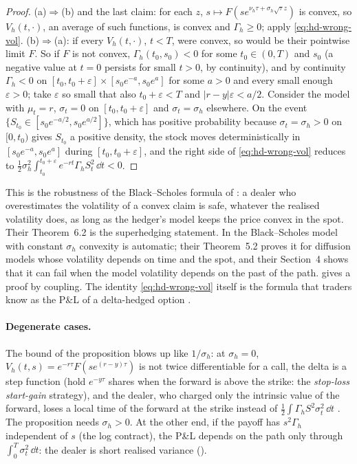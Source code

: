 \begin{proof}
(a)$\Rightarrow$(b) and the last claim: for each $z$, $s\mapsto F(se^{\nu_h\tau+\sigma_h\sqrt\tau z})$ is
convex, so $V_h(t,\cdot)$, an average of such functions, is convex and $\Gamma_h\ge0$; apply
\eqref{eq:hd-wrong-vol}. (b)$\Rightarrow$(a): if every $V_h(t,\cdot)$, $t<T$, were convex, so would be their
pointwise limit $F$. So if $F$ is not convex, $\Gamma_h(t_0,s_0)<0$ for some $t_0\in(0,T)$ and $s_0$ (a
negative value at $t=0$ persists for small $t>0$, by continuity), and by continuity $\Gamma_h<0$ on $[t_0,t_0+\varepsilon]\times[s_0e^{-a},s_0e^a]$ for some $a>0$ and every small
enough $\varepsilon>0$; take $\varepsilon$ so small that also $t_0+\varepsilon<T$ and
$|r-y|\varepsilon<a/2$. Consider the model with
$\mu_t=r$, $\sigma_t=0$ on $[t_0,t_0+\varepsilon]$ and $\sigma_t=\sigma_h$ elsewhere. On the event $\{S_{t_0}\in[s_0e^{-a/2},s_0e^{a/2}]\}$, which has positive
probability because $\sigma_t=\sigma_h>0$ on $[0,t_0)$ gives $S_{t_0}$ a positive density, the stock moves deterministically in $[s_0e^{-a},s_0e^a]$ during
$[t_0,t_0+\varepsilon]$, and the right side of \eqref{eq:hd-wrong-vol} reduces to
$\frac12\sigma_h^2\int_{t_0}^{t_0+\varepsilon}e^{-rt}\Gamma_hS_t^2\,\dd t<0$.
\end{proof}

This is the robustness of the Black--Scholes formula of \textcite{el-karoui-jeanblanc-shreve}:
a dealer who overestimates the volatility of a convex claim is safe, whatever the realised
volatility does, as long as the hedger's model keeps the price convex in the spot. Their Theorem~6.2 is the superhedging statement. In the
Black--Scholes model with constant $\sigma_h$ convexity is automatic; their Theorem~5.2 proves it for
diffusion models whose volatility depends on time and the spot, and their Section~4 shows that
it can fail when the model volatility depends on the past of the path. \textcite{hobson-1998}
gives a proof by coupling. The identity \eqref{eq:hd-wrong-vol} itself is the formula that
traders know as the P\&L of a delta-hedged option \citep{carr-faq-1997,ellersgaard-jonsson-poulsen-2017}.

\paragraph{Degenerate cases.} The bound of the proposition blows up like $1/\sigma_h$: at
$\sigma_h=0$, $V_h(t,s)=e^{-r\tau}F(se^{(r-y)\tau})$ is not twice differentiable for a call, the
delta is a step function (hold $e^{-y\tau}$ shares when the forward is above the strike: the
\emph{stop-loss start-gain} strategy), and the dealer, who charged only the intrinsic value of
the forward, loses a local time of the forward at the strike instead of
$\frac12\int\Gamma_hS^2\sigma_t^2\,\dd t$ \citep{carr-jarrow-1990}. The proposition needs $\sigma_h>0$. At the
other end, if the payoff has $s^2\Gamma_h$ independent of $s$ (the log contract), the P\&L depends
on the path only through $\int_0^T\sigma_t^2\,\dd t$: the dealer is short realised variance
().

